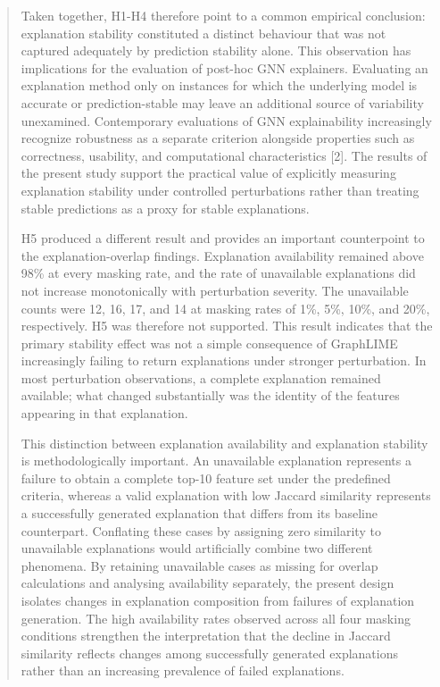 \documentclass[a4paper]{article}
\begin{document}
\begin{quote}
Taken together, H1-H4 therefore point to a common empirical conclusion:
explanation stability constituted a distinct behaviour that was not
captured adequately by prediction stability alone. This observation has
implications for the evaluation of post-hoc GNN explainers. Evaluating
an explanation method only on instances for which the underlying model
is accurate or prediction-stable may leave an additional source of
variability unexamined. Contemporary evaluations of GNN explainability
increasingly recognize robustness as a separate criterion alongside
properties such as correctness, usability, and computational
characteristics {[}2{]}. The results of the present study support the
practical value of explicitly measuring explanation stability under
controlled perturbations rather than treating stable predictions as a
proxy for stable explanations.

H5 produced a different result and provides an important counterpoint to
the explanation-overlap findings. Explanation availability remained
above 98\% at every masking rate, and the rate of unavailable
explanations did not increase monotonically with perturbation severity.
The unavailable counts were 12, 16, 17, and 14 at masking rates of 1\%,
5\%, 10\%, and 20\%, respectively. H5 was therefore not supported. This
result indicates that the primary stability effect was not a simple
consequence of GraphLIME increasingly failing to return explanations
under stronger perturbation. In most perturbation observations, a
complete explanation remained available; what changed substantially was
the identity of the features appearing in that explanation.

This distinction between explanation availability and explanation
stability is methodologically important. An unavailable explanation
represents a failure to obtain a complete top-10 feature set under the
predefined criteria, whereas a valid explanation with low Jaccard
similarity represents a successfully generated explanation that differs
from its baseline counterpart. Conflating these cases by assigning zero
similarity to unavailable explanations would artificially combine two
different phenomena. By retaining unavailable cases as missing for
overlap calculations and analysing availability separately, the present
design isolates changes in explanation composition from failures of
explanation generation. The high availability rates observed across all
four masking conditions strengthen the interpretation that the decline
in Jaccard similarity reflects changes among successfully generated
explanations rather than an increasing prevalence of failed
explanations.


\end{quote}
\end{document}
